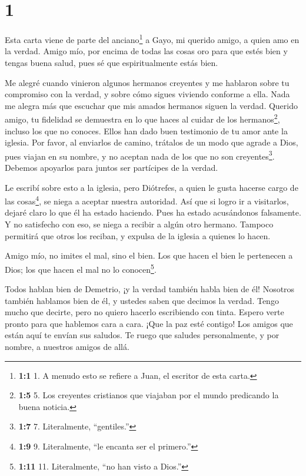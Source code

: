 \hypertarget{section}{%
\section{1}\label{section}}

 Esta carta viene de parte del anciano\footnote{\textbf{1:1}
  1. A menudo esto se refiere a Juan, el escritor de esta carta.} a
Gayo, mi querido amigo, a quien amo en la verdad.  Amigo
mío, por encima de todas las cosas oro para que estés bien y tengas
buena salud, pues sé que espiritualmente estás bien.

 Me alegré cuando vinieron algunos hermanos creyentes y me
hablaron sobre tu compromiso con la verdad, y sobre cómo sigues viviendo
conforme a ella.  Nada me alegra más que escuchar que mis
amados hermanos siguen la verdad.  Querido amigo, tu
fidelidad se demuestra en lo que haces al cuidar de los
hermanos\footnote{\textbf{1:5} 5. Los creyentes cristianos que viajaban
  por el mundo predicando la buena noticia.}, incluso los que no
conoces.  Ellos han dado buen testimonio de tu amor ante la
iglesia. Por favor, al enviarlos de camino, trátalos de un modo que
agrade a Dios,  pues viajan en su nombre, y no aceptan nada
de los que no son creyentes\footnote{\textbf{1:7} 7. Literalmente,
  ``gentiles.''}.  Debemos apoyarlos para juntos ser
partícipes de la verdad.

 Le escribí sobre esto a la iglesia, pero Diótrefes, a quien
le gusta hacerse cargo de las cosas\footnote{\textbf{1:9} 9.
  Literalmente, ``le encanta ser el primero.''}, se niega a aceptar
nuestra autoridad.  Así que si logro ir a visitarlos,
dejaré claro lo que él ha estado haciendo. Pues ha estado acusándonos
falsamente. Y no satisfecho con eso, se niega a recibir a algún otro
hermano. Tampoco permitirá que otros los reciban, y expulsa de la
iglesia a quienes lo hacen.

 Amigo mío, no imites el mal, sino el bien. Los que hacen
el bien le pertenecen a Dios; los que hacen el mal no lo
conocen\footnote{\textbf{1:11} 11. Literalmente, ``no han visto a
  Dios.''}.

 Todos hablan bien de Demetrio, ¡y la verdad también habla
bien de él! Nosotros también hablamos bien de él, y ustedes saben que
decimos la verdad.  Tengo mucho que decirte, pero no quiero
hacerlo escribiendo con tinta.  Espero verte pronto para
que hablemos cara a cara. ¡Que la paz esté contigo! Los amigos que están
aquí te envían sus saludos. Te ruego que saludes personalmente, y por
nombre, a nuestros amigos de allá.
